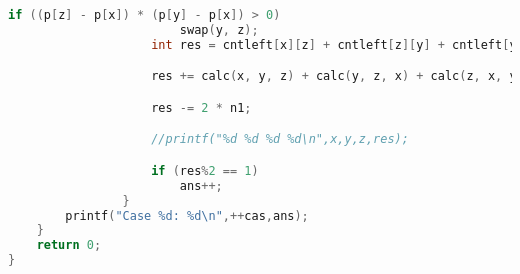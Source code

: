 \begin{lstlisting}[language=c++]
                    if ((p[z] - p[x]) * (p[y] - p[x]) > 0)
                        swap(y, z);
                    int res = cntleft[x][z] + cntleft[z][y] + cntleft[y][x];

                    res += calc(x, y, z) + calc(y, z, x) + calc(z, x, y);

                    res -= 2 * n1;

                    //printf("%d %d %d %d\n",x,y,z,res);

                    if (res%2 == 1)
                        ans++;
                }
        printf("Case %d: %d\n",++cas,ans);
    }
    return 0;
}
	\end{lstlisting}
